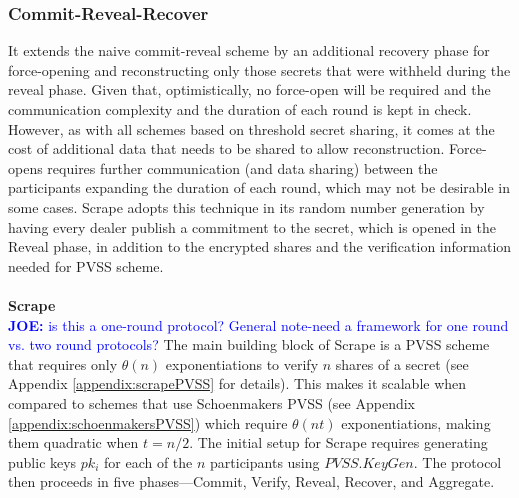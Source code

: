 \documentclass[letterpaper,twocolumn,10pt]{article}
\theoremstyle{definition}
\theoremstyle{remark}
\newcommand{\joenote}[1]{\textcolor{blue}{\textbf{JOE:} #1}}
\begin{document}
\subsubsection{Commit-Reveal-Recover}
It extends the naive commit-reveal scheme by an additional recovery phase for force-opening and reconstructing only those secrets that were withheld during the reveal phase. Given that, optimistically, no force-open will be required and the communication complexity and the duration of each round is kept in check. However, as with all schemes based on threshold secret sharing, it comes at the cost of additional data that needs to be shared to allow reconstruction. Force-opens requires further communication (and data sharing) between the participants expanding the duration of each round, which may not be desirable in some cases. Scrape adopts this technique in its random number generation by having every dealer publish a commitment to the secret, which is opened in the Reveal phase, in addition to the encrypted shares and the verification information needed for PVSS scheme.\\\\
\textbf{Scrape}\\
\joenote{is this a one-round protocol? General note-need a framework for one round vs. two round protocols?}
The main building block of Scrape is a PVSS scheme that requires only $\theta(n)$ exponentiations to verify $n$ shares of a secret (see Appendix \ref{appendix:scrapePVSS} for details). This makes it scalable when compared to schemes that use Schoenmakers PVSS (see Appendix \ref{appendix:schoenmakersPVSS}) which require $\theta(n t)$ exponentiations, making them quadratic when $t = n/2$. The initial setup for Scrape requires generating public keys $pk_i$ for each of the $n$ participants using $PVSS.KeyGen$. 
  The protocol then proceeds in five phases---Commit, Verify, Reveal, Recover, and Aggregate.
\end{document}
